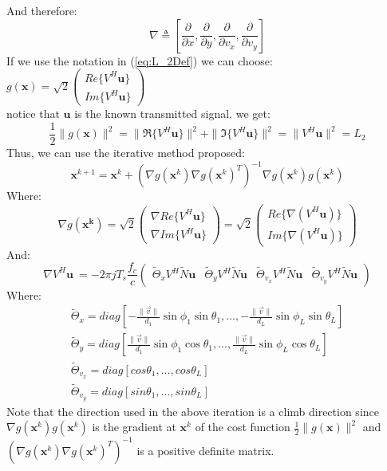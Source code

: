 \documentclass[10pt,a4paper]{report}
\begin{document}
And therefore:
\begin{equation*}
\nabla \triangleq \left[\frac{\partial}{\partial x}, \frac{\partial}{\partial y}, \frac{\partial}{\partial v_x},
\frac{\partial}{\partial v_y}\right]
\end{equation*}
If we use the notation in (\ref{eq:L_2Def}) we can choose:
$g(\mathbf{x})=\sqrt{2} \begin{pmatrix} Re\{V^H \mathbf{u}\} \\Im\{V^H \mathbf{u}\} \end{pmatrix}$ \\
notice that $\mathbf{u}$ is the known transmitted signal.
we get:
\begin{equation}
\frac{1}{2}\|g(\mathbf{x})\|^2=\|\Re\{V^H \mathbf{u}\}\|^2+\|\Im\{V^H \mathbf{u}\}\|^2 = \|V^H\mathbf{u} \|^2 = L_2
\end{equation}
Thus, we can use the iterative method proposed:
\begin{equation}
\mathbf{x}^{k+1}=\mathbf{x}^k +\left(\nabla g(\mathbf{x}^k)\nabla g(\mathbf{x}^k)^T\right)^{-1} \nabla g(\mathbf{x}^k) g(\mathbf{x}^k)
\end{equation}
Where:
\begin{equation}
\nabla g(\mathbf{x^k}) = \sqrt{2}
\begin{pmatrix} 
\nabla Re\{V^H\mathbf{u}\} \\ \nabla Im\{V^H\mathbf{u}\} 
\end{pmatrix}= \sqrt{2}
\begin{pmatrix} 
Re \{\nabla (V^H\mathbf{u})\} \\ Im\{\nabla (V^H\mathbf{u})\} 
\end{pmatrix}
\end{equation}
And:
\begin{equation}
\nabla V^H\mathbf{u}\ = -2 \pi j T_s \frac{f_c}{c}
\begin{pmatrix}  
\tilde{\Theta}_x V^H \tilde{N} \mathbf{u} &
\tilde{\Theta}_y V^H \tilde{N} \mathbf{u} &
\tilde{\Theta}_{v_x} V^H \tilde{N} \mathbf{u} &
\tilde{\Theta}_{v_y} V^H \tilde{N} \mathbf{u}
\end{pmatrix}
\end{equation}
Where: 
\begin{eqnarray}
\tilde{\Theta}_x = diag \left[-\frac{\|\vec{v}\|}{d_1} \sin \phi_1 \sin \theta_1, \dots ,-\frac{\|\vec{v}\|}{d_L} \sin \phi_L \sin \theta_L \right] \\
\tilde{\Theta}_y = diag \left[\frac{\|\vec{v}\|}{d_1} \sin \phi_1 \cos \theta_1, \dots ,\frac{\|\vec{v}\|}{d_L} \sin \phi_L \cos \theta_L \right]\\
\tilde{\Theta}_{v_x} = diag \left[cos \theta_1, \dots ,cos \theta_L \right] \\
\tilde{\Theta}_{v_y} = diag \left[sin \theta_1, \dots ,sin \theta_L \right]
\end{eqnarray}
Note that the direction used in the above iteration is a climb direction since 
$\nabla g(\mathbf{x}^k) g(\mathbf{x}^k)$ is the gradient at $\mathbf{x}^k$ of the cost function
$\frac{1}{2}\|g(\mathbf{x})\|^2$ and $\left(\nabla g(\mathbf{x}^k)\nabla g(\mathbf{x}^k)^T\right)^{-1}$ is a positive definite matrix.
\end{document}
